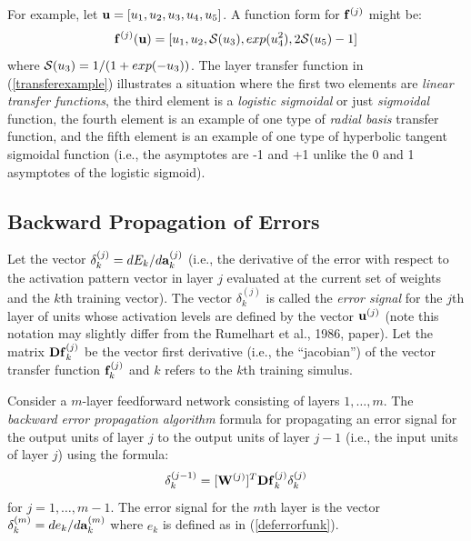 \documentclass{report}
\begin{document}
For example, let ${\bf u} = [u_1, u_2, u_3, u_4, u_5]$.
A function form for ${\bf f}^{(j)}$ might be:
\begin{equation}
\label{transferexample}
{\bf f}^{(j)}({\bf u}) =
[ u_1, u_2, {\cal S}(u_3), exp(u_4^2), 2{\cal S}(u_5) - 1]
\end{equation}
where ${\cal S}(u_3) = 1/(1+exp(-u_3))$.  The layer transfer function
in (\ref{transferexample}) illustrates a situation where the first two
elements are {\em linear transfer functions}, the third element is a
{\em logistic sigmoidal} or just {\em sigmoidal} function,
 the fourth element is an example
of one type of {\em radial basis} transfer function, and the fifth
element is an example of one type of hyperbolic tangent sigmoidal
function (i.e., the asymptotes are -1 and +1 unlike the 0 and 1
asymptotes of the logistic sigmoid).

\subsection{Backward Propagation of Errors}
Let the vector $\delta^{(j)}_k = dE_k/d{\bf a}^{(j)}_k$ (i.e., the
derivative of the error with respect to the activation pattern vector
in layer $j$ evaluated at the current set of weights and the $k$th
training vector). The vector $\delta^{(j)}_k$ is called the {\em error
signal} for the $j$th layer of units whose activation levels are
defined by the vector ${\bf u}^{(j)}$ (note this notation may slightly
differ from the Rumelhart et al., 1986, paper).  Let the matrix ${\bf
Df}^{(j)}_k$ be the vector first derivative (i.e., the ``jacobian'')
of the vector transfer function ${\bf f}^{(j)}_k$ and $k$ refers to
the $k$th training simulus.

Consider a $m$-layer feedforward network consisting of layers $1,
\ldots, m$.  The {\em backward error propagation algorithm} formula
for propagating an error signal for the output units of layer $j$ to
the output units of layer $j-1$ (i.e., the input units of layer $j$)
using the formula:
\begin{equation}
\label{bwd}
\delta^{(j-1)}_k =  [{\bf W}^{(j)}]^T {\bf Df}^{(j)}_k \delta^{(j)}_k
\end{equation}
for $j = 1, \ldots, m-1$. The error signal for the $m$th layer
is the vector $\delta^{(m)}_k = de_k/d{\bf a}^{(m)}_k$
where $e_k$ is defined as in (\ref{deferrorfunk}).
\end{document}
